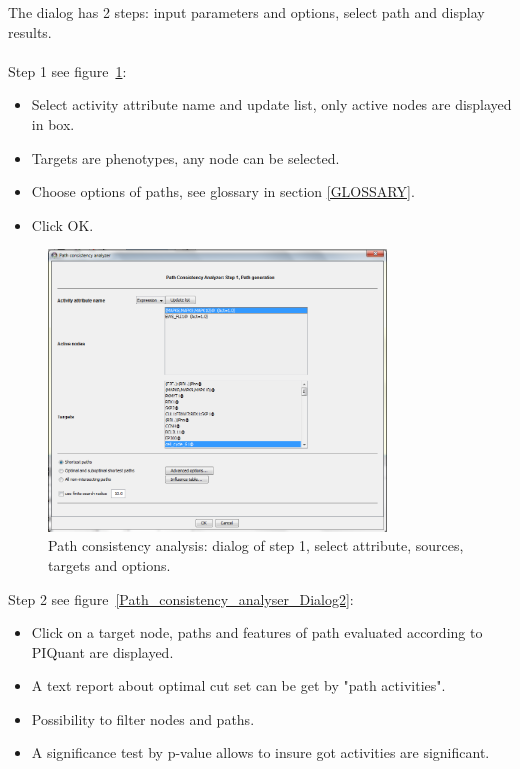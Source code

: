 The dialog has 2 steps: input parameters and options, select path and display results.\\\\
Step 1 see figure~\ref{Path_consistency_analyser_Dialog1}:
\begin{itemize}
\item Select activity attribute name and update list, only active nodes are displayed in box.
\item Targets are phenotypes, any node can be selected.
\item Choose options of paths, see glossary in section \ref{GLOSSARY}.
\item  Click OK.
\end{itemize}
\begin{figure}
\centering
\includegraphics[width=0.8\textwidth]{graphics/Path_consistency_analyser_Dialog1}
\caption{Path consistency analysis: dialog of step 1, select attribute, sources, targets and options.}
\label{Path_consistency_analyser_Dialog1}
\end{figure}
Step 2 see figure~\ref{Path_consistency_analyser_Dialog2}:
\begin{itemize}
\item Click on a target node, paths and features of path evaluated according to PIQuant are displayed.
\item A text report about optimal cut set can be get by "path activities".
\item Possibility to filter nodes and paths.
\item A  significance test by  p-value allows to insure got activities are significant.
\end{itemize}
